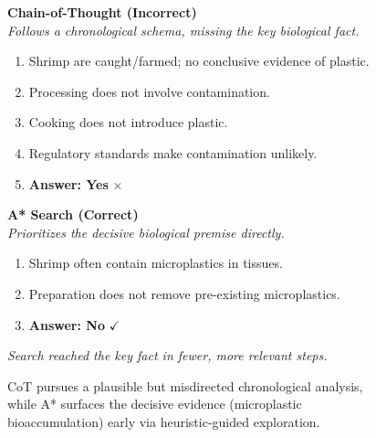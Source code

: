 \begin{figure}[htbp]
\centering
\begin{tcolorbox}[
  enhanced, colback=white, colframe=black!75, boxrule=0.7pt,
  arc=1.8mm, left=6pt, right=6pt, top=6pt, bottom=6pt,
  title=\textbf{Motivating Example}\hfill\emph{``Is shrimp scampi definitely free of plastic?''}\hfill\textbf{Gold: No},
  colbacktitle=black!4, coltitle=black, fonttitle=\small
]
\small

\begin{minipage}[t]{0.47\textwidth}
\textbf{\color{red!75!black} Chain-of-Thought (Incorrect)}\\[4pt]
\textit{Follows a chronological schema, missing the key biological fact.}
\begin{enumerate}[leftmargin=*, itemsep=1pt]
\item Shrimp are caught/farmed; no conclusive evidence of plastic.
\item Processing does not involve contamination.
\item Cooking does not introduce plastic.
\item Regulatory standards make contamination unlikely.
\item \textbf{Answer: Yes} $\times$
\end{enumerate}
\end{minipage}
\hfill
\vrule
\hfill
\begin{minipage}[t]{0.47\textwidth}
\textbf{\color{blue!75!black} A* Search (Correct)}\\[4pt]
\textit{Prioritizes the decisive biological premise directly.}
\begin{enumerate}[leftmargin=*, itemsep=1pt]
\item Shrimp often contain microplastics in tissues.
\item Preparation does not remove pre-existing microplastics.
\item \textbf{Answer: No} $\checkmark$
\end{enumerate}
\vspace{1em}
\textit{Search reached the key fact in fewer, more relevant steps.}
\end{minipage}

\end{tcolorbox}
\caption{CoT pursues a plausible but misdirected chronological analysis, while A* surfaces the decisive evidence (microplastic bioaccumulation) early via heuristic-guided exploration.}
\label{fig:motivating_example_thesis}
\end{figure}

